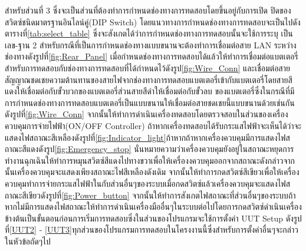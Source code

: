 สำหรับส่วนที่ 3 ซึ่งจะเป็นส่วนที่ต้องทำการกำหนดช่องทางการทดสอบโดยขึ้นอยู่กับการเปิด ปิดของสวิตซ์ชนิดมาตรฐานอินไลน์คู่(DIP Switch)
โดยแนวทางการกำหนดช่องทางการทดสอบจะเป็นไปดังตารางที่\ref{tab:select_table} ซึ่งจะสังเกตได้ว่าการกำหนดช่องทางการทดสอบนั้นจะใช้การระบุ
เป็นเลข-ฐาน 2 สำหรับกรณีที่เป็นการกำหนดช่องทางแบบขนานจะต้องทำการเชื่อมต่อสาย LAN ระหว่างช่องทางดังรูปที่\ref{fig:Rear_Panel} เมื่อกำหนดช่องทางการทดสอบได้แล้วให้ทำการเชื่อมต่อแบตเตอรี่สำหรับการทดสอบกับช่องทางการทดสอบที่ได้กำหนดไว้ดังรูป\ref{fig:Wire_Conn} และเชื่อมต่อสายสัญญาณชดเชยความต้านทานของสายไฟจากช่องทางการทดสอบแบตเตอรี่เข้ากับแบตเตอรี่โดยสายสีแดงให้เชื่อมต่อกับขั้วบวกของแบตเตอรี่ส่วนสายสีดำให้เชื่อมต่อกับขั้วลบ
ของแบตเตอรี่ซึ่งในกรณีที่มีการกำหนดช่องทางการทดสอบแบตเตอรี่เป็นแบบขนานให้เชื่อมต่อสายชดเชยนี้แบบขนานด้วยเช่นกันดังรูปที่\ref{fig:Wire_Conn}
จากนั้นให้ทำการดำเนินเครื่องทดสอบโดยตรวจสอบในส่วนของเครื่องควบคุมการจ่ายไฟฟ้า(ON/OFF Controller)
ถ้าหากเครื่องทดสอบได้รับกระแสไฟฟ้าจะเห็นได้ว่าจะแสดงไฟสถาณะสีเหลืองดังรูปที่\ref{fig:Indicator_light}ถ้าหากถ้าหากเครื่องควบคุมมีการแสดงไฟสถาณะสีแดงดังรูป\ref{fig:Emergency_stop} นั่นหมายความว่าเครื่องควบคุมยังอยู่ในสถาณะหยุดการทำงานฉุกเฉินให้ทำการหมุนสวิตซ์สีแดงไปทางขวาเพื่อให้เครื่องงควบคุมออกจากสถาณะดังกล่าวจากนั้นเครื่องควบคุมจะแสดงเพียงสถาณะไฟสีเหลืองดังเดิม จากนั้นให้ทำการกดสวิตซ์สีเขียวเพื่อให้เครื่องควบคุมทำการจ่ายกระแสไฟฟ้าในกับส่วนอื่นๆของระบบเมื่อกดสวิตซ์แล้วเครื่องควบคุมจะแสดงไฟสถาณะสีเขียวดังรูปที่\ref{fig:Power_button}
จากนั้นให้ทำการสังเกตไฟสถาณะที่ส่วนอื่นๆของระบบถ้าหากไม่มีการแสดงไฟสถาณะให้ทำการดำเนินเครื่องมืออื่นๆในระบบต่อไปโดยการกดสวิตซ์ดำเนินเครื่อง
\newline 
\hspace*{2cm}
ข้างต้นเป็นขั้นตอนก่อนการเริ่มการทดสอบซึ่งในส่วนของโปรแกรมจะใช้การตั้งค่า UUT Setup 
ดังรูปที่\ref{UUT2} - \ref{UUT3}ทุกส่วนของโปรแกรมการทดสอบในโครงงานนี้ซึ่งสำหรับการตั้งค่าอื่นๆจะกล่าวในหัวข้อถัดๆไป
